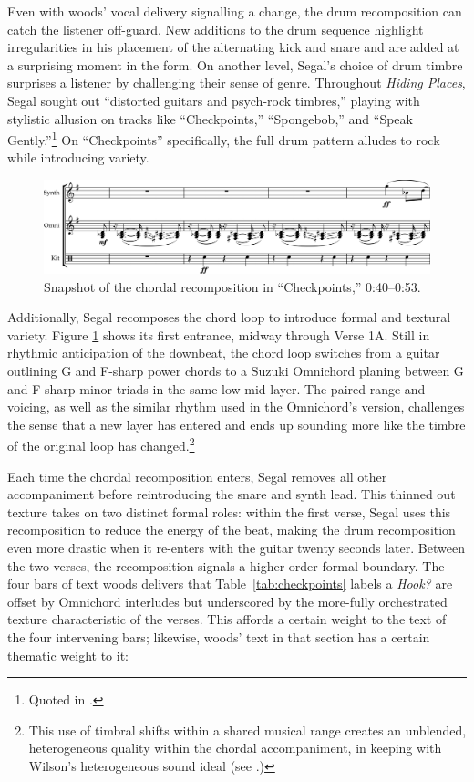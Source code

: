 Even with woods' vocal delivery signalling a change, the drum recomposition can catch the listener
off-guard. New additions to the drum sequence highlight irregularities in his placement of the 
alternating kick and snare and are added at a surprising moment in the form. On another level, 
Segal's choice of drum timbre surprises a listener by challenging their sense of genre. Throughout 
\textit{Hiding Places}, Segal sought out ``distorted guitars and psych-rock timbres,'' playing with
stylistic allusion on  tracks like ``Checkpoints,'' ``Spongebob,'' and ``Speak Gently.''\footnote{
    Quoted in \cite{backwoodzhiphopKennySegalPresents2019}.} 
On ``Checkpoints'' specifically, the full drum pattern alludes to rock while introducing variety.

    \begin{figure}[ht]
        \centering
        \includegraphics[width=\textwidth]{images/figures/chp 02/040053checkpointsrecomp.pdf}
        \caption{Snapshot of the chordal recomposition in ``Checkpoints,'' 0:40--0:53.}
        \label{fig:checkpointsrecomp}
    \end{figure}

Additionally, Segal recomposes the chord loop to introduce formal and textural variety. Figure
\ref{fig:checkpointsrecomp} shows its first entrance, midway through Verse 1A. Still in rhythmic 
anticipation of the downbeat, the chord loop switches from a guitar outlining G and F-sharp power
chords to a Suzuki Omnichord planing between G and F-sharp minor triads in the same low-mid layer.
The paired range and voicing, as well as the similar rhythm used in the Omnichord's version,
challenges the sense that a new layer has entered and ends up sounding more like the timbre of the
original loop has changed.\footnote{
    This use of timbral shifts within a shared musical range creates an unblended, heterogeneous 
    quality within the chordal accompaniment, in keeping with Wilson's heterogeneous 
    sound ideal (see \autocite[329]{ollywilsonHeterogeneousSoundIdeal1992}.)}

Each time the chordal recomposition enters, Segal removes all other accompaniment before reintroducing
the snare and synth lead. This thinned out texture takes on two distinct formal roles: within the first
verse, Segal uses this recomposition to reduce the energy of the beat, making the drum recomposition
even more drastic when it re-enters with the guitar twenty seconds later. Between the two verses,
the recomposition signals a higher-order formal boundary. The four bars of text woods delivers that
Table~\ref{tab:checkpoints} labels a \textit{Hook?} are offset by Omnichord interludes but underscored
by the more-fully orchestrated texture characteristic of the verses. This affords a certain weight to
the text of the four intervening bars; likewise, woods' text in that section has a certain thematic
weight to it:

